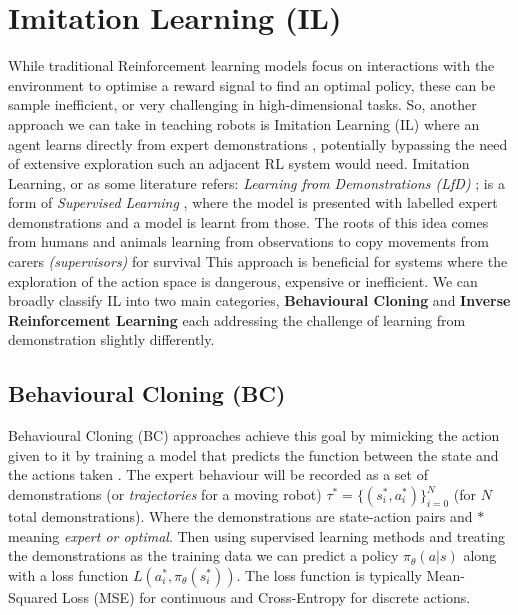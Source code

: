 \section{Imitation Learning (IL)}\label{sec:il}
  While traditional Reinforcement learning models focus on interactions with the environment to optimise a reward signal to find an optimal policy, these can be sample inefficient, or very challenging in high-dimensional tasks. So, another approach we can take in teaching robots is Imitation Learning (IL) where an agent learns directly from expert demonstrations \cite{attia2018globaloverviewimitationlearning}, potentially bypassing the need of extensive exploration such an adjacent RL system would need. Imitation Learning, or as some literature refers: \emph{Learning from Demonstrations (LfD)} \cite{ARGALL2009469}; is a form of \emph{Supervised Learning} \cite{hastie2009overview,cunningham2008supervised}, where the model is presented with labelled expert demonstrations and a model is learnt from those.
  The roots of this idea comes from humans and animals \cite{bakker1996robot} learning from observations to copy movements from carers \emph{(supervisors)} for survival This approach is beneficial for systems where the exploration of the action space is dangerous, expensive or inefficient. We can broadly classify IL into two main categories, \textbf{Behavioural Cloning} and \textbf{Inverse Reinforcement Learning} each addressing the challenge of learning from demonstration slightly differently.


\subsection{Behavioural Cloning (BC)}\label{sec:bc}
 Behavioural Cloning (BC) approaches achieve this goal by  mimicking the action given to it by training a model that predicts the function between the state and the actions taken  \cite{pomerlau1991neco.1991.3.1.88, ross2011reductionimitationlearningstructured}. The expert behaviour will be recorded as a set of demonstrations (or \emph{trajectories} for a moving robot) $\tau^* = \lbrace(s_i^*, a_i^*)\rbrace_{i = 0}^N$ (for $N$ total demonstrations). Where the demonstrations are state-action pairs and \emph{$*$} meaning \emph{expert or optimal}.
 Then using supervised learning methods and treating the demonstrations as the training data we can predict a policy $\pi_\theta\left(a | s\right)$ along with a loss function $L \left( a_i^*, \pi_\theta\left(s_i^*\right) \right)$. The loss function is typically Mean-Squared Loss (MSE) for continuous and Cross-Entropy for discrete actions.

